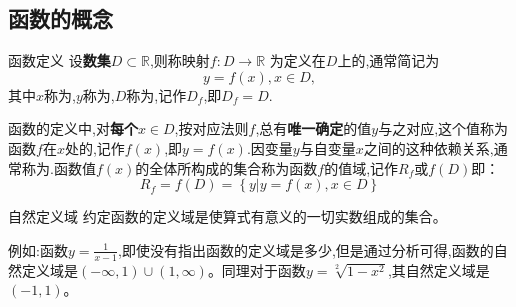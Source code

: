 \documentclass[12pt, a4paper, oneside, UTF8]{ctexbook}  %
\begin{document}
\subsection{函数的概念}
\begin{defn}{函数定义}{}
    设\textbf{数集}$D \subset \mathbb{R}$,则称映射$f:D \to \mathbb{R}$ 为定义在$D$上的,通常简记为
    $$
        y=f(x),x \in D,
    $$
    其中$x$称为,$y$称为,$D$称为,记作$D_f$,即$D_f=D$.
\end{defn}
函数的定义中,对\textbf{每个}$x \in D$,按对应法则$f$,总有\textbf{唯一确定}的值$y$与之对应,这个值称为函数$f$在$x$处的,记作$f(x)$,即$y=f(x)$.因变量$y$与自变量$x$之间的这种依赖关系,通常称为.函数值$f(x)$的全体所构成的集合称为函数$f$的值域,记作$R_f$或$f(D)$即：
$$
    R_{f}=f(D)=\left\{y|y=f(x),x\in D\right\}
$$
\begin{defn}{自然定义域}{}
    约定函数的定义域是使算式有意义的一切实数组成的集合。
\end{defn}
例如:函数$y=\frac{1}{x-1}$,即使没有指出函数的定义域是多少,但是通过分析可得,函数的自然定义域是$(-\infty,1)\cup(1,\infty)$。同理对于函数$y=\sqrt[2]{1-x^2}$,其自然定义域是$(-1,1)$。
\end{document}
